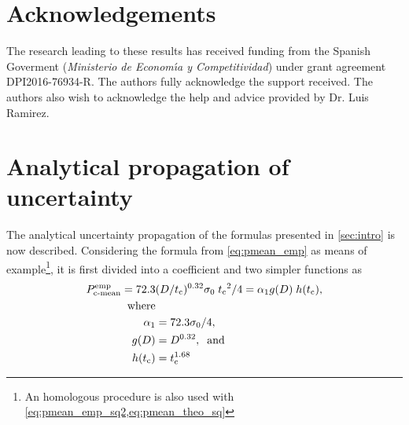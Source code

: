 \documentclass[12pt,number,preprint,review,times]{elsarticle}
\begin{document}
\section*{Acknowledgements}
The research leading to these results has received funding from the Spanish Goverment (\textit{Ministerio de Econom\'{\i}a y Competitividad}) under grant agreement DPI2016-76934-R. The authors fully acknowledge the support received. The authors also wish to acknowledge the help and advice provided by Dr. Luis Ramirez. 














\clearpage

\onecolumn
\appendix
\section{Analytical propagation of uncertainty}
\label{sec:app1}
The analytical uncertainty propagation of the formulas presented in \cref{sec:intro} is now described. Considering the formula from \cref{eq:pmean_emp} as means of example\footnote{An homologous procedure is also used with \cref{eq:pmean_emp_sq2,eq:pmean_theo_sq}}, it is first divided into a coefficient and two simpler functions as
\begin{align}
P^{\mathrm{emp}}_{\mathrm{c{\text -}mean}} = 72.3 & (D / t_\mathrm{c})^{0.32} \sigma_{0} \; {t_\mathrm{c}}^2 / {4} = \alpha_1 g(D) \; h(t_\mathrm{c}), \\   
\mathrm{where} & \nonumber \\
 \alpha_1 &= 72.3 \sigma_0 /4, \\
 g(D) &= D ^{0.32}, \; \; \mathrm{and}\\ 
 h(t_\mathrm{c}) &= t_\mathrm{c}^{1.68}
\end{align}
\end{document}
